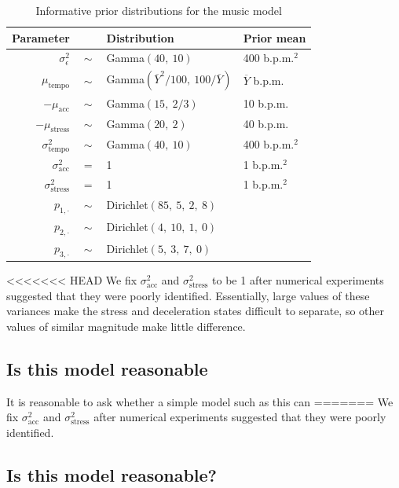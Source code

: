 \documentclass[aoas]{imsart}
\begin{document}
\begin{table}[t]
    \caption{Informative prior distributions for the music model}
  \label{tab:priors}
  \centering
  \begin{tabular}{@{}rcll@{}}
    \toprule
    Parameter & \phantom{a} & Distribution & Prior mean\\
    \midrule
    $\sigma^2_{\epsilon}$ & $\sim$ & Gamma$(40,\ 10)$ & 400 b.p.m.$^2$\\
    $\mu_{\textrm{tempo}}$ & $\sim$ & Gamma$(\overline{Y}^2/100,\ 100
                                      /\overline{Y})$ & $\overline{Y}$
                                                        b.p.m.\\
    $-\mu_{\textrm{acc}} $ & $\sim$ & Gamma$(15,\ 2/3)$ & 10 b.p.m.\\
    $-\mu_{\textrm{stress}} $ & $\sim$ & Gamma$(20,\ 2)$ & 40 b.p.m.\\
    $\sigma^2_{\textrm{tempo}} $ & $\sim$ & Gamma$(40,\ 10)$ & 400
                                                               b.p.m.$^2$\\
    $\sigma^2_{\textrm{acc}} $ & $=$ & 1 & 1 b.p.m.$^2$\\
    $\sigma^2_{\textrm{stress}} $ & $=$ & 1 & 1 b.p.m.$^2$\\
    $p_{1,\cdot}$ & $\sim$ & Dirichlet$(85,\ 5,\ 2,\ 8)$ \\
    $p_{2,\cdot}$ & $\sim$ & Dirichlet$(4,\ 10,\ 1,\ 0)$ \\
    $p_{3,\cdot}$ & $\sim$ & Dirichlet$(5,\ 3,\ 7,\ 0)$ \\
    \bottomrule
  \end{tabular}
\end{table}
<<<<<<< HEAD
We fix $\sigma^2_{\textrm{acc}}$ and $\sigma^2_{\textrm{stress}}$ to
be 1 after numerical experiments suggested
that they were poorly identified. Essentially, large values of these
variances make the stress and deceleration states difficult to
separate, so other values of similar magnitude make little difference.

\subsection{Is this model reasonable}

It is reasonable to ask whether a simple model such as this can
=======
We fix $\sigma^2_{\textrm{acc}}$ and $\sigma^2_{\textrm{stress}}$ after numerical experiments suggested
that they were poorly identified.

\subsection{Is this model reasonable?}
\end{document}
